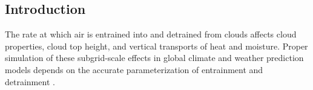 \documentclass[draft,grl]{agutex}
\begin{document}
%
%

%

\begin{article}

%
%

\section{Introduction}

The rate at which air is entrained into and detrained from clouds
affects cloud properties, cloud top height, and vertical transports of
heat and moisture.  Proper simulation of these subgrid-scale effects
in global climate and weather prediction models
depends on the accurate parameterization of entrainment and
detrainment \citep{Bechtold2008,Rougier2009,De_Rooy2010}.


\end{article}
\end{document}
